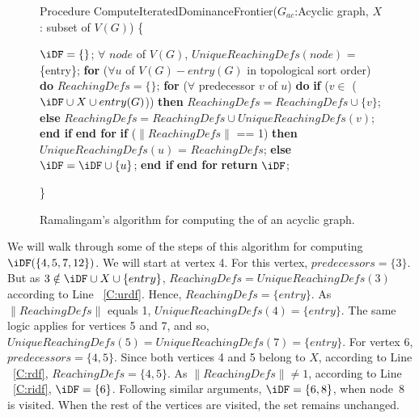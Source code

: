 {\begin{figure}[!ht]
\begin{minipage}[t]{5in}
    Procedure ComputeIteratedDominanceFrontier($G_{ac}$:Acyclic graph, $X$: subset of $V(G)$)
    \{
    \begin{code}

     $\iDF = \{\}$; 
     $\forall$ $node$ of $V(G)$, $UniqueReachingDefs(node)$ = \{entry\};
     {\bf for} ($\forall u$ of $V(G) - entry(G)$ in topological sort order) {\bf do}
        $ReachingDefs = \{\}$; 
        {\bf for} ($\forall$ predecessor $v$ of $u$) {\bf do}
          {\bf if} ($v \in$ ($\iDF \cup X \cup entry(G)$)) {\bf then} 
             $ReachingDefs = ReachingDefs \cup \{v\}$; \label{C:rdf}
          {\bf else} 
             $ReachingDefs = ReachingDefs \cup UniqueReachingDefs(v)$; \label{C:urdf}
          {\bf end if} 
       {\bf end for} 
       {\bf if} ($\|ReachingDefs\|$ == 1) {\bf then} \label{C:onerd}
          $UniqueReachingDefs(u)$ = $ReachingDefs$; 
       {\bf else} 
           $\iDF = \iDF \cup \{u\}$; \label{C:ridf}
       {\bf end if}    
     {\bf end for} 
     {\bf return} $\iDF$;   
     
    \end{code}
    \}
 
  \end{minipage}
  \caption{Ramalingam's algorithm for computing the \iDF of an acyclic graph.}
  \label{F:ramaIDF}
  \end{figure}

    We will walk through some of the steps of this algorithm for computing $\iDF(\{4,5,7,12\})$. We will start at vertex 4. For this vertex, $\textit{predecessors} = \{3\}$. But as $3 \notin \iDF \cup X \cup \{entry\}$, $\textit{ReachingDefs} = \textit{UniqueReachingDefs}(3)$ according to Line ~\ref{C:urdf}. Hence, 
$\textit{ReachingDefs} = \{entry\}$. As $\|\textit{ReachingDefs}\|$ equals 1, $\textit{UniqueReachingDefs}(4) = \{entry\}$. The same logic applies for vertices 5 and 7, and so,  $\textit{UniqueReachingDefs}(5) = \textit{UniqueReachingDefs}(7) = \{entry\}$.
    For vertex 6, $\textit{predecessors} = \{4,5\}$.
    Since both vertices 4 and 5 belong to $X$, according to Line ~\ref{C:rdf}, 
    $\textit{ReachingDefs} = \{4,5\}$.
    As $\|\textit{ReachingDefs}\| \neq 1$, according to Line ~\ref{C:ridf}, $\iDF = \{6\}$.
    Following similar arguments, $\iDF = \{6,8\}$, when node~8 is visited. When the rest of the vertices
    are visited, the \iDF set remains unchanged. 

}
